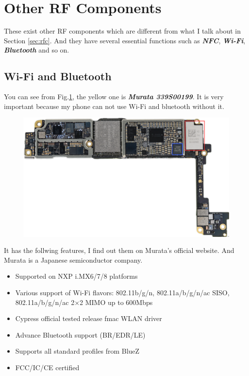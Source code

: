 \documentclass[conference]{IEEEtran}
\begin{document}
\section{Other RF Components}\label{sec:orfc}
These exist other RF components which are different from what I talk about in Section \ref{sec:rfc}. And they have several essential functions such as {\bfseries{\emph{NFC}}}, {\bfseries{\emph{Wi-Fi}}}, {\bfseries{\emph{Bluetooth}}} and so on.

\subsection{Wi-Fi and Bluetooth}
You can see from Fig.\ref{fig:wifi_bluetooth_NFC}, the yellow one is {\bfseries{\emph{Murata 339S00199}}}. It is very important because my phone can not use Wi-Fi and bluetooth without it. 
\begin{figure}[!ht]
	\centering
	\begin{center}
		\includegraphics*[width=0.8\linewidth]{wifi_bluetooth_NFC}
		\caption{}
		\label{fig:wifi_bluetooth_NFC}
	\end{center}
\end{figure}

It has the follwing features\cite{wifibluetooth.org}, I find out them on Murata's official website. And Murata is a Japanese semiconductor company.
\begin{itemize}
	\item Supported on NXP i.MX6/7/8 platforms
	\item Various support of Wi-Fi flavors: 802.11b/g/n, 802.11a/b/g/n/ac SISO, 802.11a/b/g/n/ac 2$\times$2 MIMO up to 600Mbps
	\item Cypress official tested release fmac WLAN driver
	\item Advance Bluetooth support (BR/EDR/LE)
	\item Supports all standard profiles from BlueZ
	\item FCC/IC/CE certified
\end{itemize}
\end{document}
